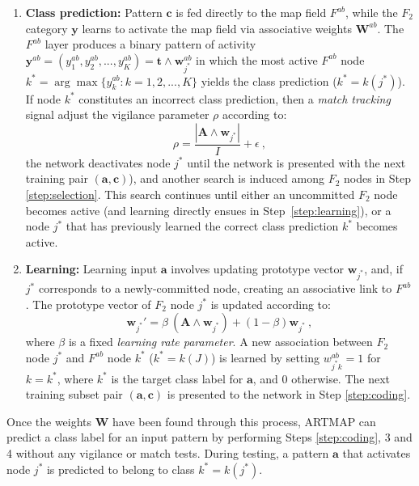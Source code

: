 \begin{enumerate}
		\item \textbf{Class prediction:} Pattern $\textbf{c}$ is fed directly to the map field $F^{ab}$, while the $F_2$ category $\textbf{y}$ learns to activate the map field via associative weights $\textbf{W}^{ab}$. The $F^{ab}$ layer produces a binary pattern of activity $\textbf{y}^{ab}	= (y^{ab}_1, y^{ab}_2, ..., y^{ab}_K) = \textbf{t} \wedge \textbf{w}^{ab}_{j^*}$ in which the most active $F^{ab}$ node $k^* = \arg\max \{y^{ab}_k : k = 1, 2, ..., K\}$ yields the class	prediction ($k^*=k(j^*)$). If node $k^*$ constitutes an incorrect class prediction, then a \emph{match tracking} signal adjust the vigilance parameter $\rho$ according to:
		\begin{equation}\label{eq:c1_mt}
			\rho = \frac{|\textbf{A} \wedge \textbf{w}_{j^*}|}{I} + \epsilon \ ,
		\end{equation}
the network deactivates node $j^*$ until the network is presented with the next training pair $(\textbf{a}, \textbf{c})$), and another search is induced among $F_2$ nodes in Step \ref{step:selection}. This search continues until either an uncommitted $F_2$ node becomes active (and learning directly ensues in Step~\ref{step:learning}), or a node $j^*$ that has previously learned the correct class prediction $k^*$ becomes active.
		\label{step:prediction}

    \item \textbf{Learning:} Learning input $\textbf{a}$ involves updating prototype vector $\textbf{w}_{j^*}$, and, if $j^*$ corresponds to a newly-committed node, creating an associative link to $F^{ab}$. The prototype vector of $F_2$ node $j^*$ is updated according to:
        \begin{equation}\label{eq:c1_learning}
            \textbf{w}_{j^*}' = \beta\ (\textbf{A} \wedge \textbf{w}_{j^*}) + 
            									  (1 - \beta) \textbf{w}_{j^*} \ ,
        \end{equation}
where $\beta$ is a fixed \emph{learning rate parameter}. A new association between $F_2$ node $j^*$ and $F^{ab}$ node $k^*$ ($k^* = k(J)$) is learned by setting $w^{ab}_{j^*k}=1$ for $k=k^*$, where $k^*$ is the target class label for $\textbf{a}$, and 0 otherwise.
      The next training subset pair $(\textbf{a}, \textbf{c})$ is presented to
      the network in Step \ref{step:coding}.
    \label{step:learning}
\end{enumerate}
Once the weights $\textbf{W}$ have been found through this process, ARTMAP can predict a class label for an input pattern by performing Steps \ref{step:coding}, 3 and 4 without any vigilance or match tests. During testing, a pattern $\textbf{a}$ that activates node $j^*$ is predicted to belong to class $k^*=k(j^*)$.

